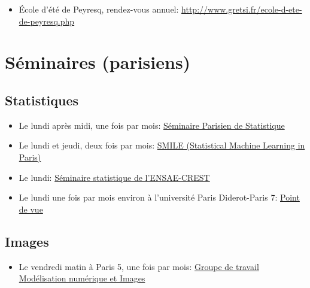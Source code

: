 \begin{itemize}
\item \'Ecole d'été de Peyresq, rendez-vous annuel:
\url{http://www.gretsi.fr/ecole-d-ete-de-peyresq.php}
\end{itemize}


\section{Séminaires (parisiens)}

\subsection{Statistiques}

\begin{itemize}
 \item Le lundi après midi, une fois par mois:
 \href{https://sites.google.com/site/semstats/}{Séminaire Parisien de Statistique}
 \item Le lundi et jeudi, deux fois par mois:  
\href{https://sites.google.com/site/smileinparis/home}{SMILE (Statistical Machine Learning in Paris)}
 \item Le lundi: 
\href{http://certis.enpc.fr/~dalalyan/seminar.html}{Séminaire statistique de l'ENSAE-CREST}
 \item Le lundi une fois par mois environ \`a l'universit\'e Paris Diderot-Paris 7:  
\href{http://dominiquepicard.blogspot.fr/p/seminaire-point-de-vue.html}{Point de vue}
\end{itemize}



\subsection{Images}
\begin{itemize}
 
 \item Le vendredi matin \`a Paris 5, une fois par mois:
 \href{http://w3.mi.parisdescartes.fr/map5/-Groupe-de-travail-Modelisation-}
{Groupe de travail Modélisation numérique et Images
}
\end{itemize}
